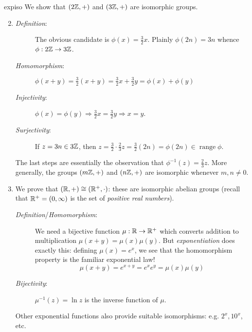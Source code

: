 \begin{examples}{}{expiso}
	\exstart We show that $(2\mathbb{Z},+)$ and $(3\mathbb{Z},+)$ are isomorphic groups.
	\begin{enumerate}\setcounter{enumi}{1}
	  \item[]\begin{description}
	  	\item[\emph{Definition}:] The obvious candidate\footnotemark{} is $\phi(x)=\frac 32x$. Plainly $\phi(2n)=3n$ whence $\phi:2\mathbb{Z}\to 3\mathbb{Z}$.
	  	\item[\emph{Homomorphism}:] $\phi(x+y)=\frac 32(x+y)=\frac 32x+\frac 32y=\phi(x)+\phi(y)$
	  	\item[\emph{Injectivity}:] $\phi(x)=\phi(y)\Longrightarrow \frac 32x=\frac 32y\Longrightarrow x=y$.
	  	\item[\emph{Surjectivity}:] If $z=3n\in 3\mathbb{Z}$, then $z=\frac 32\cdot\frac 23z=\frac 32(2n)=\phi(2n)\in\operatorname{range}\phi$.
		\end{description}
		The last steps are essentially the observation that $\phi^{-1}(z)=\frac 23z$.\smallbreak
		More generally, the groups $(m\mathbb{Z},+)$ and $(n\mathbb{Z},+)$ are isomorphic whenever $m,n\neq 0$. 
	
		\item\label{ex:expiso1}	We prove that $(\mathbb{R},+)\cong(\mathbb{R}^+,\cdot)$: these are isomorphic abelian groups (recall that $\mathbb{R}^+=(0,\infty)$ is the set of \emph{positive real numbers}).
		\begin{description}
	  	\item[\emph{Definition}/\emph{Homomorphism}:] We need a bijective function $\mu:\mathbb{R}\to\mathbb{R}^+$ which converts addition to multiplication $\mu(x+y)=\mu(x)\mu(y)$. But \emph{exponentiation} does exactly this: defining $\mu(x)=e^x$, we see that the homomorphism property is the familiar exponential law! 
	  	\[
	  		\mu(x+y)=e^{x+y}=e^xe^y=\mu(x)\mu(y)
	  	\]
	  	\item[\emph{Bijectivity}:] $\mu^{-1}(z)=\ln z$ is the inverse function of $\mu$.
		\end{description}
		Other exponential functions also provide suitable isomorphisms: e.g.{} $2^x,10^x$, etc.
	\end{enumerate}
\end{examples}





